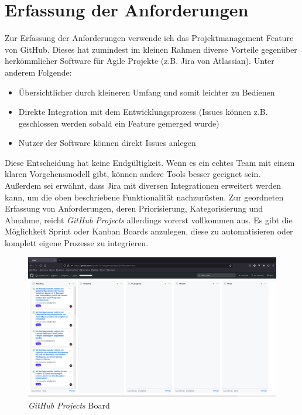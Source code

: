 \documentclass{article}
\begin{document}

\section{Erfassung der Anforderungen}

Zur Erfassung der Anforderungen verwende ich das Projektmanagement Feature von GitHub. Dieses hat zumindest im
kleinen Rahmen diverse Vorteile gegenüber herkömmlicher Software für Agile Projekte (z.B. Jira von Atlassian).
Unter anderem Folgende:

\begin{itemize}
	\item Übersichtlicher durch kleineren Umfang und somit leichter zu Bedienen
	\item Direkte Integration mit dem Entwicklungsprozess (Issues können z.B.
	      geschlossen werden sobald ein Feature gemerged wurde)
	\item Nutzer der Software können direkt Issues anlegen
\end{itemize}

Diese Entscheidung hat keine Endgültigkeit. Wenn es ein echtes Team mit einem klaren Vorgehensmodell gibt, können
andere Tools besser geeignet sein. Außerdem sei erwähnt, dass Jira mit diversen Integrationen erweitert werden
kann, um die oben beschriebene Funktionalität nachzurüsten. Zur geordneten Erfassung von Anforderungen, deren
Priorisierung, Kategorisierung und Abnahme, reicht \emph{GitHub Projects} allerdings vorerst vollkommen aus. Es
gibt die Möglichkeit Sprint oder Kanban Boards anzulegen, diese zu automatisieren oder komplett eigene Prozesse
zu integrieren.

\vspace{0.5em}

\begin{figure}[ht]
	\includegraphics[width=1\textwidth]{github-projects}
	\centering
	\caption{\emph{GitHub Projects} Board}
\end{figure}
\end{document}
